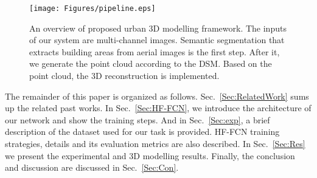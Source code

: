 \begin{center}
\begin{figure}
\texttt{[image: Figures/pipeline.eps]}
\caption{An overview of proposed urban 3D modelling framework. The inputs of our system are multi-channel images. Semantic segmentation that extracts building areas from aerial images is the first step. After it, we generate the point cloud according to the DSM. Based on the point cloud, the 3D reconstruction is implemented.}
\label{fig:overview}
\end{figure}
\end{center} 



The remainder of this paper is organized as follows. Sec.~\ref{Sec:RelatedWork} sums up the related past works. In Sec.~\ref{Sec:HF-FCN}, we introduce the architecture of our network and show the training steps. And in Sec.~\ref{Sec:exp}, a brief description of the dataset used for our task is provided. HF-FCN training strategies, details and its evaluation metrics are also described. In Sec.~\ref{Sec:Res} we present the experimental and 3D modelling results. 
Finally, the conclusion and discussion are discussed in Sec.~\ref{Sec:Con}.
